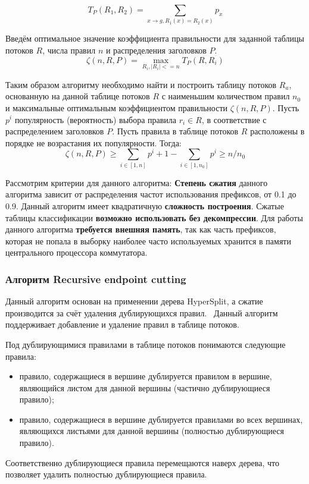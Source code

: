 \documentclass[oneside,final,12pt]{extarticle}
\begin{document}
            \[T_P(R_1, R_2) = \sum_{x \rightarrow g, R_1(x) = R_2(x)} p_x\]

            Введём оптимальное значение коэффициента правильности для заданной таблицы потоков \(R\), числа правил \(n\) и распределения заголовков \(P\).
            \[\zeta(n, R, P) = \max_{R_i, |R_i| <= n} T_P(R, R_i)\]
            
            Таким образом алгоритму необходимо найти и построить таблицу потоков \(R_a\), основанную на данной таблице потоков \(R\)
            с наименьшим количеством правил \(n_0\) и максимальные оптимальным коэффициентом правильности \(\zeta(n, R, P)\).
            Пусть \(p^i\) популярность (вероятность) выбора правила \(r_i \in R\), в соответствие с распределением заголовков \(P\). Пусть
            правила в таблице потоков \(R\) расположены в порядке не возрастания их популярности. Тогда:
            \[\zeta(n, R, P) \geq \sum_{i \in [1, n]} p^i + 1 - \sum_{i \in [1, n_0]} p^i \geq n/n_0\]

            Рассмотрим критерии для данного алгоритма: \textbf{Степень сжатия} данного алгоритма зависит от распределения частот использования префиксов, от 0.1 до 0.9.
            Данный алгоритм имеет квадратичную \textbf{сложность построения}. Сжатые таблицы классификации \textbf{возможно использовать без декомпрессии}.
            Для работы данного алгоритма \textbf{требуется внешняя память}, так как часть префиксов, которая не попала в выборку наиболее часто используемых хранится в
            памяти центрального процессора коммутатора.
        \subsubsection{Алгоритм Recursive endpoint cutting}
            Данный алгоритм основан на применении дерева HyperSplit, а сжатие производится за счёт удаления дублирующихся правил.~\cite{chang2019fast}
            Данный алгоритм поддерживает добавление и удаление правил в таблице потоков.

            Под дублирующимися правилами в таблице потоков понимаются следующие правила:
            \begin{itemize}
                \item правило, содержащиеся в вершине дублируется правилом в вершине, являющийся листом для данной вершины (частично дублирующиеся правило);
                \item правило, содержащиеся в вершине дублируется правилами во всех вершинах, являющихся листьями для данной вершины (полностью дублирующиеся правило).
            \end{itemize}
            Соответственно дублирующиеся правила перемещаются наверх дерева, что позволяет удалить полностью дублирующиеся правила.
            
\end{document}
